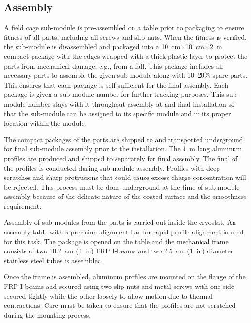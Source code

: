 \subsection{Assembly}
A field cage sub-module is pre-assembled on a table prior to packaging to ensure fitness of all parts, including all screws and slip nuts.   When the fitness is verified, the sub-module is disassembled and packaged into a \SI{10}{\cm}$\times$\SI{10}{\cm}$\times$\SI{2}{\m} compact package with the edges wrapped with a thick plastic layer to protect the parts from mechanical damage, e.g., from a fall.  This package includes all necessary parts to assemble the given sub-module along with \numrange{10}{20}\% spare parts.  This ensures that each package is self-sufficient for the final assembly.  Each package is given a sub-module number for further tracking purposes.  This sub-module number stays with it throughout assembly at \surf and final installation so that the sub-module can be assigned to its specific module and in its proper location within the module. 

The compact packages of the   parts are shipped to \surf and transported underground for final sub-module assembly prior to the installation.   The \SI{4}{\m} long aluminum profiles are produced and shipped to \surf separately for final assembly.  The final  of the profiles is conducted during sub-module assembly.   Profiles with deep scratches and sharp protrusions that could cause excess charge concentration will be rejected. This process must be done underground at the time of sub-module assembly because of the delicate nature of the coated surface and the smoothness requirement. 

Assembly of sub-modules from the parts is carried out inside the  cryostat. An assembly table with a precision alignment bar for rapid profile alignment is used for this task.   The package is opened on the table and the mechanical frame consists of two \SI{10.2}{\cm} (\SI{4}{in}) FRP I-beams and two \SI{2.5}{\cm} (\SI{1}{in}) diameter stainless steel tubes is assembled.

Once the frame is assembled, aluminum profiles are mounted on the flange of the FRP I-beams and secured using two slip nuts and metal screws with one side secured tightly while the other loosely to allow motion due to thermal contractions.  Care must be taken to ensure that the profiles are not scratched during the mounting process. 

